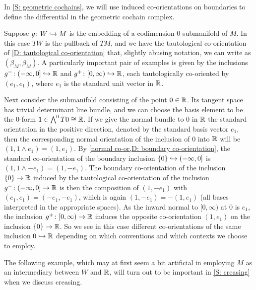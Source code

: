 In \cref{S: geometric cochains}, we will use induced co-orientations on boundaries to define the differential in the geometric cochain complex.



\begin{example}\label{E: splitting example 1}
	Suppose $g \colon W \hookrightarrow M$ is the embedding of a codimension-$0$ submanifold of $M$.
	In this case $TW$ is the pullback of $TM$, and we have the tautological co-orientation of \cref{D: tautological co-orientation} that, slightly abusing notation, we can write as $(\beta_M,\beta_M)$.
	A particularly important pair of examples is given by the inclusions $g^- \colon (-\infty, 0] \hookrightarrow \mathbb{R}$ and $g^+ \colon [0,\infty) \hookrightarrow \mathbb{R}$, each tautologically co-oriented by $(e_1,e_1)$, where $e_1$ is the standard unit vector in $\mathbb{R}$.

	Next consider the submanifold consisting of the point $0 \in \mathbb{R}$.
	Its tangent space has trivial determinant line bundle, and we can choose the basis element to be the $0$-form $1 \in \bigwedge^0 T0 \cong \mathbb{R}$. If we give the normal bundle to $0$ in $\mathbb{R}$ the standard orientation in the positive direction, denoted by the standard basis vector $e_1$, then the corresponding normal orientation of the inclusion of $0$ into $\mathbb{R}$ will be $(1, 1 \wedge e_1) = (1, e_1)$. 
	By \cref{normal co-or,D: boundary co-orientation}, the standard co-orientation of the boundary inclusion $\{0\} \hookrightarrow (-\infty, 0]$ is $(1, 1 \wedge -e_1) = (1, -e_1)$.
	The boundary co-orientation of the inclusion $\{0\} \to \mathbb{R}$ induced by the tautological co-orientation of the inclusion $g^- \colon (-\infty, 0] \to \mathbb{R}$ is then the composition of $(1, -e_1)$ with $(e_1, e_1)=(-e_1,-e_1)$, which is again $(1,-e_1) = -(1,e_1)$ (all bases interpreted in the appropriate spaces).
	As the inward normal to $[0,\infty)$ at $0$ is $e_1$, the inclusion $g^+ \colon [0,\infty) \to \mathbb{R}$ induces the opposite co-orientation $(1, e_1)$ on the inclusion $\{0\} \to \mathbb{R}$.
	So we see in this case different co-orientations of the same inclusion $0\hookrightarrow \mathbb{R}$ depending on which conventions and which contexts we choose to employ.
\end{example}

The following example, which may at first seem a bit artificial in employing $M$ as an intermediary between $W$ and $\mathbb{R}$, will turn out to be important in \cref{S: creasing} when we discuss creasing.

